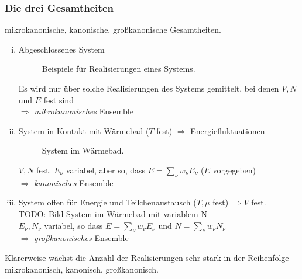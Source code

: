 \subsubsection{Die drei Gesamtheiten}
mikrokanonische, kanonische, großkanonische Gesamtheiten.
\begin{enumerate}[i)]
    \item Abgeschlossenes System \\
    \begin{figure}[H]
        \centering
        \def\svgwidth{0.9\textwidth}
        
        \caption{Beispiele für Realisierungen eines Systems.}
        \label{img:realisationsMKE}
\end{figure}
     Es wird nur über solche Realisierungen des Systems gemittelt, bei denen $V, N$ und $E$ fest sind \\
    $\Rightarrow$ \emph{mikrokanonisches} Ensemble
    \item System in Kontakt mit Wärmebad ($T$ fest) $\Rightarrow$ Energiefluktuationen \\
    \begin{figure}[H]
        \centering
        \def\svgwidth{0.5\textwidth}
        
        \caption{System im Wärmebad.}
        \label{img:systemInHeatBath}
\end{figure}
    $V, N$ fest. $E_\nu$ variabel, aber so, dass $E=\sum_\nu w_\nu E_\nu$ ($E$ vorgegeben) \\
    $\Rightarrow$ \emph{kanonisches} Ensemble
    \item System offen für Energie und Teilchenaustausch ($T, \mu$ fest) $\Rightarrow V$ fest. \\
    TODO: Bild System im Wärmebad mit variablem N \\  %
    $E_\nu, N_\nu$ variabel, so dass $E=\sum_\nu w_\nu E_\nu$ und $N=\sum_\nu w_\nu N_\nu$ \\
    $\Rightarrow$ \emph{großkanonisches} Ensemble
\end{enumerate}
Klarerweise wächst die Anzahl der Realisierungen sehr stark in der Reihenfolge mikrokanonisch, kanonisch, großkanonisch.

